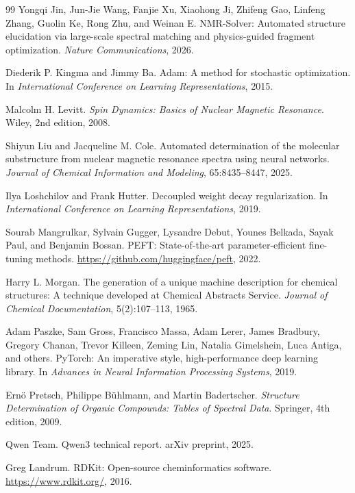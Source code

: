 \documentclass{article}
\begin{document}
{\begin{thebibliography}{99}
Yongqi Jin, Jun-Jie Wang, Fanjie Xu, Xiaohong Ji, Zhifeng Gao, Linfeng Zhang, Guolin Ke, Rong Zhu, and Weinan E.
NMR-Solver: Automated structure elucidation via large-scale spectral matching and physics-guided fragment optimization.
\textit{Nature Communications}, 2026.

Diederik P. Kingma and Jimmy Ba.
Adam: A method for stochastic optimization.
In \textit{International Conference on Learning Representations}, 2015.

Malcolm H. Levitt.
\textit{Spin Dynamics: Basics of Nuclear Magnetic Resonance}.
Wiley, 2nd edition, 2008.

Shiyun Liu and Jacqueline M. Cole.
Automated determination of the molecular substructure from nuclear magnetic resonance spectra using neural networks.
\textit{Journal of Chemical Information and Modeling}, 65:8435--8447, 2025.

Ilya Loshchilov and Frank Hutter.
Decoupled weight decay regularization.
In \textit{International Conference on Learning Representations}, 2019.

Sourab Mangrulkar, Sylvain Gugger, Lysandre Debut, Younes Belkada, Sayak Paul, and Benjamin Bossan.
PEFT: State-of-the-art parameter-efficient fine-tuning methods.
\url{https://github.com/huggingface/peft}, 2022.

Harry L. Morgan.
The generation of a unique machine description for chemical structures: A technique developed at Chemical Abstracts Service.
\textit{Journal of Chemical Documentation}, 5(2):107--113, 1965.

Adam Paszke, Sam Gross, Francisco Massa, Adam Lerer, James Bradbury, Gregory Chanan, Trevor Killeen, Zeming Lin, Natalia Gimelshein, Luca Antiga, and others.
PyTorch: An imperative style, high-performance deep learning library.
In \textit{Advances in Neural Information Processing Systems}, 2019.

Ern{\"o} Pretsch, Philippe B{\"u}hlmann, and Martin Badertscher.
\textit{Structure Determination of Organic Compounds: Tables of Spectral Data}.
Springer, 4th edition, 2009.

Qwen Team.
Qwen3 technical report.
arXiv preprint, 2025.

Greg Landrum.
RDKit: Open-source cheminformatics software.
\url{https://www.rdkit.org/}, 2016.


\end{thebibliography}}
\end{document}
